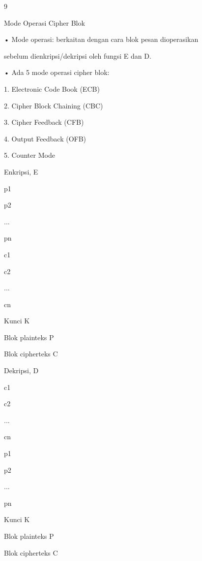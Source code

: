 \documentclass{article}
\begin{document}

9

Mode Operasi Cipher Blok

• Mode operasi: berkaitan dengan cara blok pesan dioperasikan 

sebelum dienkripsi/dekripsi oleh fungsi E dan D.

• Ada 5 mode operasi cipher blok:

 1. Electronic Code Book (ECB)

 2. Cipher Block Chaining (CBC)

 3. Cipher Feedback (CFB)

 4.   Output Feedback (OFB)

   5.   Counter Mode

Enkripsi, E

p1

p2

...

pn

c1

c2

...

cn

Kunci K

Blok plainteks P

Blok cipherteks C

Dekripsi, D

c1

c2

...

cn

p1

p2

...

pn

Kunci K

Blok plainteks P

Blok cipherteks C
\end{document}
